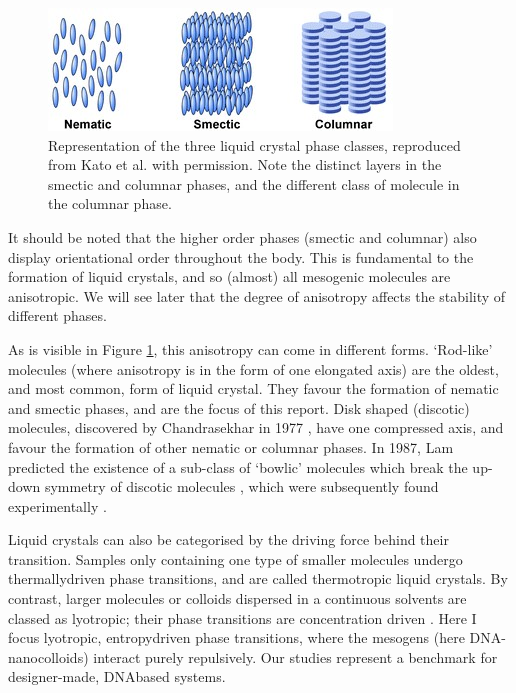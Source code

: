 \documentclass[11pt, a4paper]{article} %
\begin{document}
\begin{figure} [h!]
	\centering
	\includegraphics[width=0.7\linewidth]{Figures/lc_phases_cropped}
	\caption{Representation of the three liquid crystal phase classes, reproduced from Kato et al. \cite{Kato2007} with permission. Note the distinct layers in the smectic and columnar phases, and the different class of molecule in the columnar phase.}
	\label{fig:lcphasescropped}
\end{figure}


It should be noted that the higher order phases (smectic and columnar) also display orientational order throughout the body. This is fundamental to the formation of liquid crystals, and so (almost) all mesogenic molecules are anisotropic. We will see later that the degree of anisotropy affects the stability of different phases. 

As is visible in Figure \ref{fig:lcphasescropped}, this anisotropy can come in different forms. `Rod-like' molecules (where anisotropy is in the form of one elongated axis) are the oldest, and most common, form of liquid crystal. They favour the formation of nematic and smectic phases, and are the focus of this report. Disk shaped (discotic) molecules, discovered by Chandrasekhar in 1977 \cite{Chandrasekhar1977}, have one compressed axis, and favour the formation of other nematic or columnar phases. In 1987, Lam predicted the existence of a sub-class of `bowlic' molecules which break the up-down symmetry of discotic molecules \cite{LinLei1988}, which were subsequently found experimentally \cite{Zimmermann1985, Malthete1985}.

Liquid crystals can also be categorised by the driving force behind their transition. Samples only containing one type of smaller molecules undergo thermally\textendash driven phase transitions, and are called thermotropic liquid crystals. By contrast, larger molecules or colloids dispersed in a continuous solvents are classed as lyotropic; their phase transitions are concentration driven \cite{DeGennes1993}. Here I focus lyotropic, entropy\textendash driven phase transitions, where the mesogens (here DNA-nanocolloids) interact purely repulsively. Our studies represent a benchmark for designer-made, DNA\textendash based systems.
\end{document}
